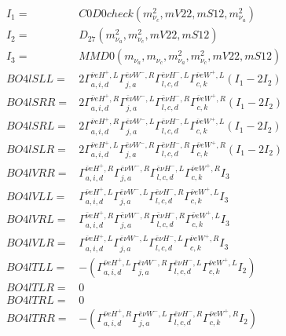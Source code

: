 \documentclass[A4,landscape]{article}
\begin{document}
\begin{align} 
I_1 = & C0D0check(m^2_{\nu_{{c}}}, mV22, mS12, m^2_{\nu_{{a}}}) \\ 
I_2 = & D_{27}(m^2_{\nu_{{a}}}, m^2_{\nu_{{c}}}, mV22, mS12) \\ 
I_3 = & MMD0(m_{\nu_{{a}}}, m_{\nu_{{c}}}, m^2_{\nu_{{a}}}, m^2_{\nu_{{c}}}, mV22, mS12) \\ 
  BO4lSLL= & 2  \Gamma^{\bar{\nu}e H^+,L}_{a, i, d} \Gamma^{\bar{e}\nu W^- ,R}_{j, a} \Gamma^{\bar{e}\nu H^- ,L}_{l, c, d} \Gamma^{\bar{\nu}e W^+,L}_{c, k} (I_1 - 2 I_2) \\ 
  BO4lSRR= & 2  \Gamma^{\bar{\nu}e H^+,R}_{a, i, d} \Gamma^{\bar{e}\nu W^- ,L}_{j, a} \Gamma^{\bar{e}\nu H^- ,R}_{l, c, d} \Gamma^{\bar{\nu}e W^+,R}_{c, k} (I_1 - 2 I_2) \\ 
  BO4lSRL= & 2  \Gamma^{\bar{\nu}e H^+,R}_{a, i, d} \Gamma^{\bar{e}\nu W^- ,L}_{j, a} \Gamma^{\bar{e}\nu H^- ,L}_{l, c, d} \Gamma^{\bar{\nu}e W^+,L}_{c, k} (I_1 - 2 I_2) \\ 
  BO4lSLR= & 2  \Gamma^{\bar{\nu}e H^+,L}_{a, i, d} \Gamma^{\bar{e}\nu W^- ,R}_{j, a} \Gamma^{\bar{e}\nu H^- ,R}_{l, c, d} \Gamma^{\bar{\nu}e W^+,R}_{c, k} (I_1 - 2 I_2) \\ 
  BO4lVRR= &  \Gamma^{\bar{\nu}e H^+,R}_{a, i, d} \Gamma^{\bar{e}\nu W^- ,R}_{j, a} \Gamma^{\bar{e}\nu H^- ,L}_{l, c, d} \Gamma^{\bar{\nu}e W^+,R}_{c, k} I_3 \\ 
  BO4lVLL= &  \Gamma^{\bar{\nu}e H^+,L}_{a, i, d} \Gamma^{\bar{e}\nu W^- ,L}_{j, a} \Gamma^{\bar{e}\nu H^- ,R}_{l, c, d} \Gamma^{\bar{\nu}e W^+,L}_{c, k} I_3 \\ 
  BO4lVRL= &  \Gamma^{\bar{\nu}e H^+,R}_{a, i, d} \Gamma^{\bar{e}\nu W^- ,R}_{j, a} \Gamma^{\bar{e}\nu H^- ,R}_{l, c, d} \Gamma^{\bar{\nu}e W^+,L}_{c, k} I_3 \\ 
  BO4lVLR= &  \Gamma^{\bar{\nu}e H^+,L}_{a, i, d} \Gamma^{\bar{e}\nu W^- ,L}_{j, a} \Gamma^{\bar{e}\nu H^- ,L}_{l, c, d} \Gamma^{\bar{\nu}e W^+,R}_{c, k} I_3 \\ 
  BO4lTLL= & -( \Gamma^{\bar{\nu}e H^+,L}_{a, i, d} \Gamma^{\bar{e}\nu W^- ,R}_{j, a} \Gamma^{\bar{e}\nu H^- ,L}_{l, c, d} \Gamma^{\bar{\nu}e W^+,L}_{c, k} I_2) \\ 
  BO4lTLR= & 0 \\ 
  BO4lTRL= & 0 \\ 
  BO4lTRR= & -( \Gamma^{\bar{\nu}e H^+,R}_{a, i, d} \Gamma^{\bar{e}\nu W^- ,L}_{j, a} \Gamma^{\bar{e}\nu H^- ,R}_{l, c, d} \Gamma^{\bar{\nu}e W^+,R}_{c, k} I_2) \\ 
\end{align} 
\end{document}
